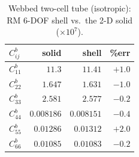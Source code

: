 \begin{table}[htpb]
\centering
\caption{Webbed two-cell tube (isotropic): RM 6-DOF shell vs.\ the 2-D solid ($\times10^{7}$).}
\label{tab:two}
\begin{tabular}{l rrr}
\hline
$C^{b}_{ij}$ & solid & shell & \%err \\
\hline
$C^{b}_{11}$ & $11.3$ & $11.41$ & $+1.0$ \\
$C^{b}_{22}$ & $1.647$ & $1.631$ & $-1.0$ \\
$C^{b}_{33}$ & $2.581$ & $2.577$ & $-0.2$ \\
$C^{b}_{44}$ & $0.008186$ & $0.008151$ & $-0.4$ \\
$C^{b}_{55}$ & $0.01286$ & $0.01312$ & $+2.0$ \\
$C^{b}_{66}$ & $0.01085$ & $0.01083$ & $-0.2$ \\
\hline
\end{tabular}
\end{table}